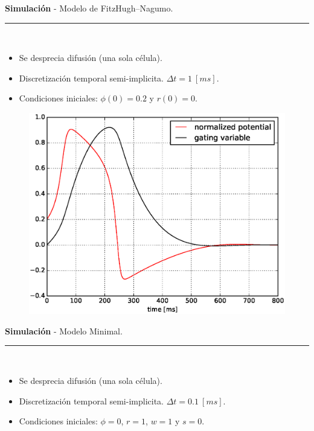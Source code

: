 \documentclass[11pt]{beamer}
\begin{document}
\begin{frame}[t]
	\vspace*{0.5 cm} \textbf{Simulación} - Modelo de FitzHugh–Nagumo.
	\color{brown}\rule{\linewidth}{4pt} \\ [0.2 cm]
	
	\begin{itemize}
		\item Se desprecia difusión (una sola célula).
		\item Discretización temporal semi-implicita. $\Delta t = 1~[ms]$.
		\item Condiciones iniciales:  $\phi(0) = 0.2$ y $r(0) = 0$.
	\end{itemize}
	
  \begin{figure}[H]
  	\centering 
  	\includegraphics[height = 5 cm]{fig/EX1-FHN_single_cell.eps}
  \end{figure}
\end{frame}

\begin{frame}[t]
\vspace*{0.5 cm} \textbf{Simulación} - Modelo Minimal.
\color{brown}\rule{\linewidth}{4pt} \\ [0.2 cm]

\begin{itemize}
	\item Se desprecia difusión (una sola célula).
	\item Discretización temporal semi-implicita. $\Delta t = 0.1~[ms]$.
	\item Condiciones iniciales: $\phi = 0$, $r = 1$, $w = 1$ y $s = 0$.
\end{itemize}

	\begin{figure}[!htbp]
		\centering
	\end{figure}	
\end{frame}
\end{document}
